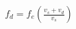 \documentclass[preview]{standalone}
\begin{document}
\begin{align*}
f_d = f_e \left(\frac{v_s + v_d}{v_s}\right)
\end{align*}
\end{document}
